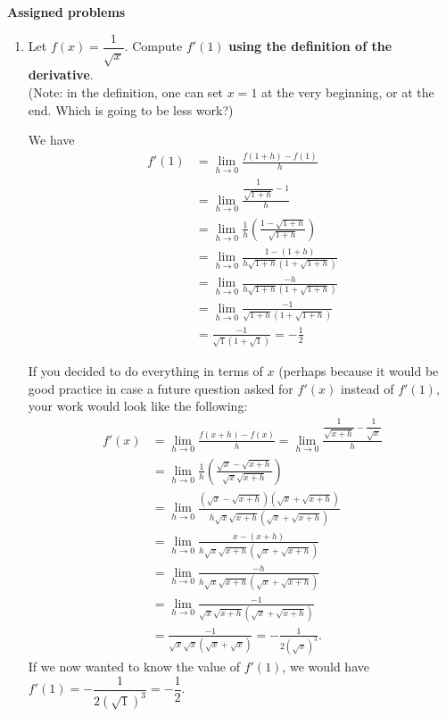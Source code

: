 \documentclass[12pt]{article}
\begin{document}
\textbf{Assigned problems}

  \begin{enumerate}
    \item Let $f(x) = \dfrac{1}{\sqrt{x}}$. Compute $f'(1)$ \textbf{using the definition of the derivative}.\\
    (Note: in the definition, one can set $x=1$ at the very beginning, or at the end. Which is going to be less work?)
    
\medskip

We have
\begin{align*}
f'(1) &= \lim_{h\to 0}\frac{f(1+h)-f(1)}{h} \tag{definition of the derivative}\\
& = \lim_{h\to 0}\frac{\dfrac{1}{\sqrt{1+h}}-1}{h} \tag{putting in the function; note $f(1)=1$}\\
& = \lim_{h\to 0}\frac{1}{h}\left(\frac{1-\sqrt{1+h}}{\sqrt{1+h}}\right) \tag{common denominator}\\
& = \lim_{h\to 0}\frac{1-(1+h)}{h\sqrt{1+h}(1+\sqrt{1+h})} \tag{rationalizing the numerator}\\
& = \lim_{h\to 0}\frac{-h}{h\sqrt{1+h}(1+\sqrt{1+h})} \tag{simplifying the numerator}\\
& = \lim_{h\to 0}\frac{-1}{\sqrt{1+h}(1+\sqrt{1+h})} \tag{cancelling $h$ top and bottom}\\
& = \frac{-1}{\sqrt{1}(1+\sqrt{1})} = -\frac12 
\end{align*}

If you decided to do everything in terms of $x$ (perhaps because it would be good practice in case a future question asked for $f'(x)$ instead of $f'(1)$, your work would look like the following:
\begin{align*}
f'(x) & = \lim_{h\to 0}\frac{f(x+h)-f(x)}{h} = \lim_{h\to 0}\frac{\dfrac{1}{\sqrt{x+h}}-\dfrac{1}{\sqrt{x}}}{h}\\[5pt]
& = \lim_{h\to 0}\frac{1}{h}\left(\frac{\sqrt{x}-\sqrt{x+h}}{\sqrt{x}\sqrt{x+h}}\right)\\[5pt]
& = \lim_{h\to 0}\frac{(\sqrt{x}-\sqrt{x+h})(\sqrt{x}+\sqrt{x+h})}{h\sqrt{x}\sqrt{x+h}(\sqrt{x}+\sqrt{x+h})}\\[5pt]
& = \lim_{h\to 0}\frac{x-(x+h)}{h\sqrt{x}\sqrt{x+h}(\sqrt{x}+\sqrt{x+h})}\\[5pt]
& = \lim_{h\to 0}\frac{-h}{h\sqrt{x}\sqrt{x+h}(\sqrt{x}+\sqrt{x+h})}\\[5pt]
& = \lim_{h\to 0}\frac{-1}{\sqrt{x}\sqrt{x+h}(\sqrt{x}+\sqrt{x+h})}\\[5pt]
& = \frac{-1}{\sqrt{x}\sqrt{x}(\sqrt{x}+\sqrt{x})}=-\frac{1}{2(\sqrt{x})^3}.
\end{align*}
If we now wanted to know the value of $f'(1)$, we would have $f'(1)=-\dfrac{1}{2(\sqrt{1})^3}=-\dfrac12$.
    

\end{enumerate}
\end{document}
